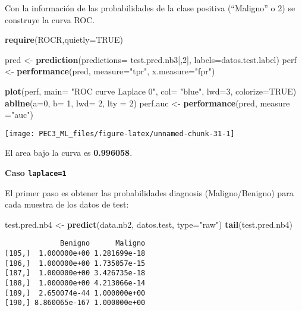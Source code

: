 \documentclass[
]{article}
\newenvironment{Shaded}{\begin{snugshade}}{\end{snugshade}}
\newcommand{\DataTypeTok}[1]{\textcolor[rgb]{0.13,0.29,0.53}{#1}}
\newcommand{\DecValTok}[1]{\textcolor[rgb]{0.00,0.00,0.81}{#1}}
\newcommand{\KeywordTok}[1]{\textcolor[rgb]{0.13,0.29,0.53}{\textbf{#1}}}
\newcommand{\NormalTok}[1]{#1}
\newcommand{\OtherTok}[1]{\textcolor[rgb]{0.56,0.35,0.01}{#1}}
\newcommand{\StringTok}[1]{\textcolor[rgb]{0.31,0.60,0.02}{#1}}
\begin{document}
Con la información de las probabilidades de la clase positiva
(``Maligno'' o 2) se construye la curva ROC.

\begin{Shaded}
\begin{Highlighting}[]
\KeywordTok{require}\NormalTok{(ROCR,}\DataTypeTok{quietly=}\OtherTok{TRUE}\NormalTok{)}

\NormalTok{pred <-}\StringTok{ }\KeywordTok{prediction}\NormalTok{(}\DataTypeTok{predictions=}\NormalTok{ test.pred.nb3[,}\DecValTok{2}\NormalTok{], }\DataTypeTok{labels=}\NormalTok{datos.test.label)}
\NormalTok{perf <-}\StringTok{ }\KeywordTok{performance}\NormalTok{(pred, }\DataTypeTok{measure=}\StringTok{"tpr"}\NormalTok{, }\DataTypeTok{x.measure=}\StringTok{"fpr"}\NormalTok{)}

\KeywordTok{plot}\NormalTok{(perf, }\DataTypeTok{main=} \StringTok{"ROC curve Laplace 0"}\NormalTok{, }\DataTypeTok{col=} \StringTok{"blue"}\NormalTok{, }\DataTypeTok{lwd=}\DecValTok{3}\NormalTok{, }\DataTypeTok{colorize=}\OtherTok{TRUE}\NormalTok{)}
\KeywordTok{abline}\NormalTok{(}\DataTypeTok{a=}\DecValTok{0}\NormalTok{, }\DataTypeTok{b=} \DecValTok{1}\NormalTok{, }\DataTypeTok{lwd=} \DecValTok{2}\NormalTok{, }\DataTypeTok{lty =} \DecValTok{2}\NormalTok{)}
\NormalTok{perf.auc <-}\StringTok{ }\KeywordTok{performance}\NormalTok{(pred, }\DataTypeTok{measure =}\StringTok{"auc"}\NormalTok{)}
\end{Highlighting}
\end{Shaded}

\begin{center}\texttt{[image: PEC3\_ML\_files/figure-latex/unnamed-chunk-31-1]} \end{center}

El area bajo la curva es \textbf{0.996058}.

\textbf{Caso \texttt{laplace=1}}

El primer paso es obtener las probabilidades diagnosis (Maligno/Benigno)
para cada muestra de los datos de test:

\begin{Shaded}
\begin{Highlighting}[]
\NormalTok{test.pred.nb4 <-}\StringTok{ }\KeywordTok{predict}\NormalTok{(data.nb2, datos.test, }\DataTypeTok{type=}\StringTok{"raw"}\NormalTok{)}
\KeywordTok{tail}\NormalTok{(test.pred.nb4)}
\end{Highlighting}
\end{Shaded}

\begin{verbatim}
             Benigno      Maligno
[185,]  1.000000e+00 1.281699e-18
[186,]  1.000000e+00 1.735057e-15
[187,]  1.000000e+00 3.426735e-18
[188,]  1.000000e+00 4.213066e-14
[189,]  2.650074e-44 1.000000e+00
[190,] 8.860065e-167 1.000000e+00
\end{verbatim}
\end{document}
